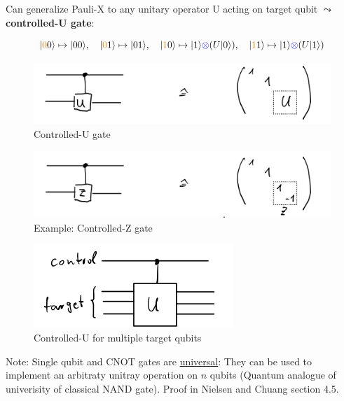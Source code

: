 Can generalize Pauli-X to any unitary operator U acting on target qubit $\leadsto$ 
\textbf{controlled-U gate}:

\begin{equation*}
    \lvert{\color{orange}0}0\rangle \mapsto \lvert00\rangle, 
    \quad \lvert{\color{orange}0}1\rangle \mapsto \lvert01\rangle, 
    \quad \lvert{\color{orange}1}0\rangle \mapsto \lvert1\rangle {\color{blue} \otimes} (U\lvert0\rangle), 
    \quad \lvert{\color{orange}1}1\rangle \mapsto \lvert1\rangle {\color{blue} \otimes} (U\lvert1\rangle)
\end{equation*}

\begin{figure}[H]
    \centering
    \includegraphics[scale=0.5]{chapters/res/contolled-u-gate-circuit.png}
    \caption{Controlled-U gate}
\end{figure}

\begin{figure}[H]
    \centering
    \includegraphics[scale=0.5]{chapters/res/controlled-z-gate-circuit.png}
    \caption{Example: Controlled-Z gate}
\end{figure}

\begin{figure}[H]
    \centering
    \includegraphics[scale=0.5]{chapters/res/controlled-u-multiple-targets.png}
    \caption{Controlled-U for multiple target qubits}
\end{figure}

Note: Single qubit and CNOT gates are \underline{universal}: They can be used to implement an 
arbitraty unitray operation on $n$ qubits (Quantum analogue of univerisity of classical NAND gate).
Proof in Nielsen and Chuang section 4.5.

